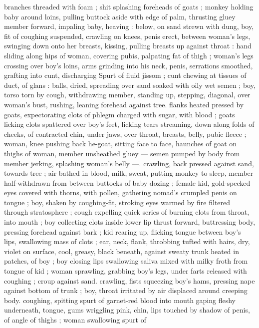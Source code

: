 branches threaded with foam ; shit splashing foreheads of goats ; 
monkey holding baby around loins, pulling buttock aside with edge 
of palm, thrusting gluey member forward, impaling baby, heaving : 
below, on sand strewn with dung, boy, fit of coughing suspended, 
crawling on knees, penis erect, between woman's legs, swinging 
down onto her breasts, kissing, pulling breasts up against throat : 
hand sliding along hips of woman, covering pubis, palpating fat of 
thigh ; woman's legs crossing over boy's loins, arms grinding into his 
neck, penis, serrations smoothed, grafting into cunt, discharging 
Spurt of fluid jissom ; cunt chewing at tissues of duct, of glans : 
balls, dried, spreading over sand soaked with oily wet semen ; boy, 
torso torn by cough, withdrawing member, standing up, stepping, 
diagonal, over woman's bust, rushing, leaning forehead against tree. 
flanks heated pressed by goats, expectorating clots of phlegm 
charged with sugar, with blood ; goats licking clots spattered over 
boy's feet, licking tears streaming, down along folds of cheeks, of 
contracted chin, under jaws, over throat, breasts, belly, pubic fleece 
; woman, knee pushing back he-goat, sitting face to face, haunches 
of goat on thighs of woman, member unsheathed gluey --- semen 
pumped by body from member jerking, splashing woman's belly ---. 
crawling, back pressed against sand, towards tree ; air bathed in 
blood, milk, sweat, putting monkey to sleep, member half-withdrawn 
from between buttocks of baby dozing ; female kid, gold-specked 
eyes covered with thorns, with pollen, gathering nomad's crumpled 
penis on tongue ; boy, shaken by coughing-fit, stroking eyes warmed 
by fire filtered through stratosphere ; cough expelling quick series of 
burning clots from throat, into mouth ; boy collecting clots inside 
lower lip thrust forward, buttressing body, pressing forehead against 
bark ; kid rearing up, flicking tongue between boy's lips, swallowing 
mass of clots ; ear, neck, flank, throbbing tufted with hairs, dry, violet 
on surface, cool, greasy, black beneath, against sweaty trunk heated 
in patches, of boy ; boy closing lips swallowing saliva mixed with 
milky froth from tongue of kid ; woman sprawling, grabbing boy's 
legs, under farts released with coughing ; croup against sand. 
crawling, fists squeezing boy's hams, pressing nape against bottom 
of trunk ; boy, throat irritated by air displaced around creeping body. 
coughing, spitting spurt of garnet-red blood into mouth gaping 
fleshy underneath, tongue, gums wriggling pink, chin, lips touched 
by shadow of penis, of angle of thighs ; woman swallowing spurt of 
